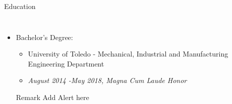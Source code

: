 \begin{frame}{Education}
\begin{columns}
        \begin{itemize}
        \item Bachelor's Degree: 
        \begin{itemize}
          \item University of Toledo - Mechanical, Industrial and Manufacturing Engineering Department
          \item \textit{August 2014 -May 2018, Magna Cum Laude Honor}
        \end{itemize}  
          \begin{block}{Remark}
             Add Alert here
          \end{block}
        \end{itemize}   
    \end{columns}
\end{frame}
